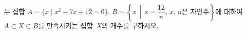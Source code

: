 두 집합 $A=\{x \mid x^2-7x+12=0\}$, $B=\left\{x \,\middle|\, x=\dfrac{12}{n},\ x,\,n\text{은 자연수}\right\}$에 대하여 $A\subset X\subset B$를 만족시키는 집합~$X$의 개수를 구하시오.
